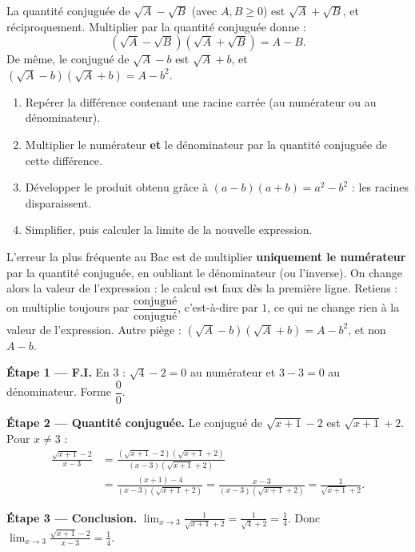 \documentclass[11pt]{article}
\newcommand{\cle}[1]{{\popxbold\color{popdark}#1}}
\begin{document}
\begin{definition}
La \cle{quantité conjuguée} de $\sqrt{A} - \sqrt{B}$ (avec $A, B \geq 0$) est $\sqrt{A} + \sqrt{B}$, et réciproquement. Multiplier par la quantité conjuguée donne :
\[ \left(\sqrt{A} - \sqrt{B}\right)\left(\sqrt{A} + \sqrt{B}\right) = A - B. \]
De même, le conjugué de $\sqrt{A} - b$ est $\sqrt{A} + b$, et $\left(\sqrt{A}-b\right)\left(\sqrt{A}+b\right) = A - b^2$.
\end{definition}

\begin{methode}
\begin{enumerate}
\item Repérer la différence contenant une racine carrée (au numérateur ou au dénominateur).
\item Multiplier le numérateur \textbf{et} le dénominateur par la quantité conjuguée de cette différence.
\item Développer le produit obtenu grâce à $(a-b)(a+b) = a^2 - b^2$ : les racines disparaissent.
\item Simplifier, puis calculer la limite de la nouvelle expression.
\end{enumerate}
\end{methode}

\begin{attention}
L'erreur la plus fréquente au Bac est de multiplier \textbf{uniquement le numérateur} par la quantité conjuguée, en oubliant le dénominateur (ou l'inverse). On change alors la valeur de l'expression : le calcul est faux dès la première ligne. Retiens : on multiplie toujours par $\dfrac{\text{conjugué}}{\text{conjugué}}$, c'est-à-dire par $1$, ce qui ne change rien à la valeur de l'expression. Autre piège : $(\sqrt{A} - b)(\sqrt{A} + b) = A - b^2$, et non $A - b$.
\end{attention}

\begin{exemplebox}
\textbf{Étape 1 — F.I.} En $3$ : $\sqrt{4} - 2 = 0$ au numérateur et $3 - 3 = 0$ au dénominateur. Forme $\dfrac{0}{0}$.

\textbf{Étape 2 — Quantité conjuguée.} Le conjugué de $\sqrt{x+1} - 2$ est $\sqrt{x+1} + 2$. Pour $x \neq 3$ :
\begin{align*}
\frac{\sqrt{x+1}-2}{x-3} &= \frac{\left(\sqrt{x+1}-2\right)\left(\sqrt{x+1}+2\right)}{(x-3)\left(\sqrt{x+1}+2\right)} \\
&= \frac{(x+1) - 4}{(x-3)\left(\sqrt{x+1}+2\right)} = \frac{x-3}{(x-3)\left(\sqrt{x+1}+2\right)} = \frac{1}{\sqrt{x+1}+2}.
\end{align*}

\textbf{Étape 3 — Conclusion.} $\displaystyle\lim_{x \to 3} \frac{1}{\sqrt{x+1}+2} = \frac{1}{\sqrt{4}+2} = \frac{1}{4}$. Donc $\displaystyle\lim_{x \to 3} \frac{\sqrt{x+1}-2}{x-3} = \frac{1}{4}$.
\end{exemplebox}
\end{document}
